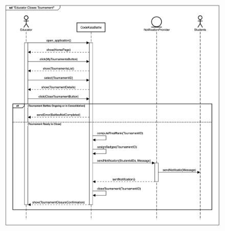 \documentclass{Configuration_Files/Template}
\begin{document}
\begin{figure}[H]
\includegraphics[scale = 0.45]{Images/SequenceDiagrams/EducatorClosesTournamentSeqDiagram.png}\\
\centering
\end{figure}
\end{document}
